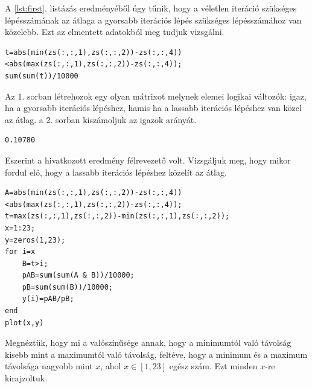 \documentclass[a4paper,12pt]{report}
\begin{document}
				A \ref{lst:first}. listázás eredményéből úgy tűnik, hogy a véletlen iteráció szükséges lépésszámának az átlaga a gyorsabb iterációs lépés szükséges lépésszámához van közelebb. Ezt az elmentett adatokból meg tudjuk vizsgálni.
				\begin{singlespace}
                \begin{lstlisting}[caption=Bemenet]
t=abs(min(zs(:,:,1),zs(:,:,2))-zs(:,:,4))<abs(max(zs(:,:,1),zs(:,:,2))-zs(:,:,4));
sum(sum(t))/10000
				\end{lstlisting}
                \end{singlespace}
				Az 1. sorban létrehozok egy olyan mátrixot melynek elemei logikai változók: igaz, ha a gyorsabb iterációs lépéshez, hamis ha a lassabb iterációs lépéshez van közel az átlag. a 2. sorban kiszámoljuk az igazok arányát.
				\begin{singlespace}
                \begin{lstlisting}[caption=Eredm\'eny]
0.10780
				\end{lstlisting}
                \end{singlespace}
				Eszerint a hivatkozott eredmény félrevezető volt. Vizsgáljuk meg, hogy mikor fordul elő, hogy a lassabb iterációs lépéshez közelít az átlag.
		        \begin{singlespace}
                \begin{lstlisting}[caption=Bemenet,label=lst:feltP]
A=abs(min(zs(:,:,1),zs(:,:,2))-zs(:,:,4))<abs(max(zs(:,:,1),zs(:,:,2))-zs(:,:,4));
t=max(zs(:,:,1),zs(:,:,2))-min(zs(:,:,1),zs(:,:,2));
x=1:23;
y=zeros(1,23);
for i=x
    B=t>i;
    pAB=sum(sum(A & B))/10000;
    pB=sum(sum(B))/10000;
    y(i)=pAB/pB;
end
plot(x,y)
                \end{lstlisting}
                \end{singlespace}
                Megnéztük, hogy mi a valószínűsége annak, hogy a minimumtól való távolság kisebb mint a maximumtól való távolság, feltéve, hogy a minimum és a maximum távolsága nagyobb mint $x$, ahol $x\in [1,23]$ egész szám. Ezt minden $x$-re kirajzoltuk.
\end{document}
